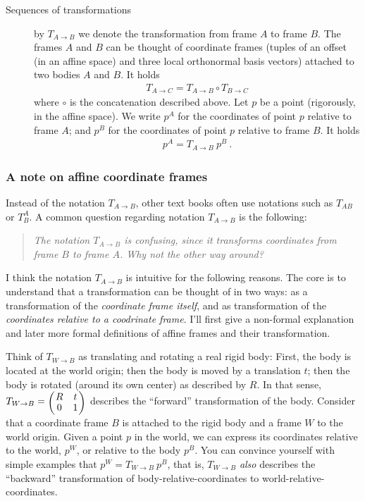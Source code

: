 \begin{description}
\item[Sequences of transformations] by $T_{A\to
B}$ we denote the transformation from frame $A$ to frame
$B$. The frames $A$ and $B$ can be thought of coordinate frames
(tuples of an offset (in an affine space) and three local orthonormal
basis vectors) attached to two bodies $A$ and $B$. It holds
\begin{align}
T_{A\to C} = T_{A\to B} \circ T_{B\to C}
\end{align}
where $\circ$ is the concatenation described above. Let $p$ be a point
(rigorously, in the affine space). We write $p^A$ for the coordinates
of point $p$ relative to frame $A$; and $p^B$ for the
coordinates of point $p$ relative to frame $B$. It holds
\begin{align}
p^A = T_{A\to B}~ p^B ~.
\end{align}
\end{description}

\subsubsection{A note on affine coordinate frames}

Instead of the notation $T_{A\to B}$, other text books often use
notations such as $T_{AB}$ or $T^A_B$. A common question regarding
notation $T_{A\to B}$ is the following:
\begin{quote}
\emph{The notation $T_{A\to B}$ is
confusing, since it transforms coordinates from frame $B$ to frame
$A$. Why not the other way around?}
\end{quote}
I think the notation $T_{A\to B}$ is intuitive for the following
reasons. The core is to understand that a transformation can be
thought of in two ways: as a transformation of the \emph{coordinate
frame itself}, and as transformation of the \emph{coordinates relative
to a coodrinate frame}. I'll first give a non-formal explanation and
later more formal definitions of affine frames and their
transformation.

Think of $T_{W\to B}$ as translating and rotating a real rigid body:
First, the body is located at the world origin; then the body is moved
by a translation $t$; then the body is rotated (around its own center)
as described by $R$. In that sense, $T_{W\to B} = \mat{cc}{R & t \\ 0
& 1} $ describes the ``forward'' transformation of the body. Consider
that a coordinate frame $B$ is attached to the rigid body and a frame
$W$ to the world origin. Given a point $p$ in the world, we can
express its coordinates relative to the world, $p^W$, or relative to
the body $p^B$. You can convince yourself with simple examples that
$p^W = T_{W\to B}~ p^B$, that is, $T_{W\to B}$ \emph{also} describes
the ``backward'' transformation of body-relative-coordinates to
world-relative-coordinates.

